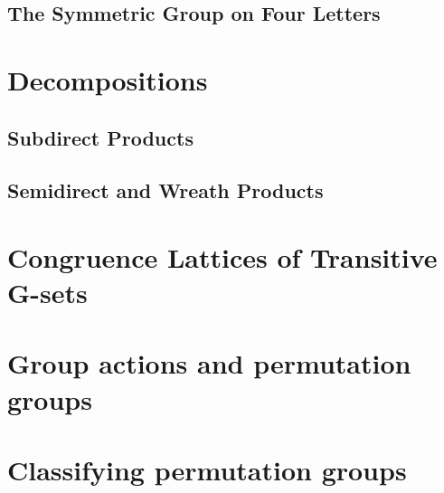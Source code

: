 \subsection{The Symmetric Group on Four Letters}



\newpage

\section{Decompositions}
\subsection{Subdirect Products}


\subsection{Semidirect and Wreath Products}


\newpage

\section{Congruence Lattices of Transitive G-sets}


\newpage
\section{Group actions and permutation groups}


\newpage

\section{Classifying permutation groups}
\label{sec:class-perm-groups}





